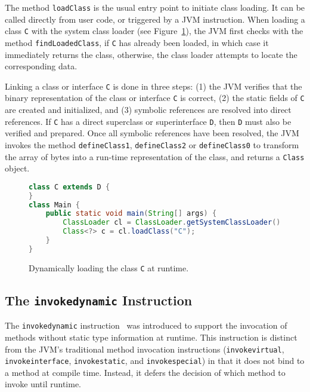 The method \verb|loadClass| is the usual entry point to initiate class loading. It can be called directly from user code, or triggered by a JVM instruction.
When loading a class \verb|C| with the system class loader (see Figure~\ref{fig:class_C}), the JVM first checks with the method \verb|findLoadedClass|, if \verb|C| has already been loaded, in which case it immediately returns the class, otherwise, the class loader attempts to locate the corresponding data. 

Linking a class or interface \verb|C| is done in three steps: (1) the JVM verifies that the binary representation of the class or interface \verb|C| is correct, (2) the static fields of \verb|C| are created and initialized, and (3) symbolic references are resolved into direct references. If \verb|C| has a direct superclass or superinterface \verb|D|, then \verb|D| must also be verified and prepared. 
Once all symbolic references have been resolved, the JVM invokes the method \verb|defineClass1|, \verb|defineClass2| or \verb|defineClass0| to transform the array of bytes into a run-time representation of the class, and returns a \verb|Class| object.

\begin{figure}[ht]
    \centering
\begin{lstlisting}[language=Java]
class C extends D {
}
class Main {
    public static void main(String[] args) {
        ClassLoader cl = ClassLoader.getSystemClassLoader();
        Class<?> c = cl.loadClass("C");
    }
}
\end{lstlisting}
    \caption{Dynamically loading the class \texttt{C} at runtime.}
    \label{fig:class_C}
\end{figure}

\subsection{The \texttt{invokedynamic} Instruction}
The \verb|invokedynamic| instruction~\cite{noauthor_java_nodate} was introduced to support the invocation of methods without static type information at runtime.
This instruction is distinct from the JVM's traditional method invocation instructions (\verb|invokevirtual|, \verb|invokeinterface|, \verb|invokestatic|, and \verb|invokespecial|) in that it does not bind to a method at compile time. Instead, it defers the decision of which method to invoke until runtime.

